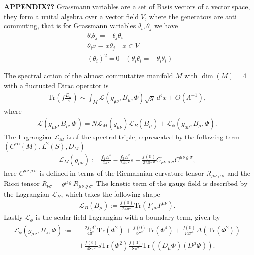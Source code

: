 \textbf{APPENDIX??}
Grassmann variables are a set of Basis vectors of a vector space, they
form a unital algebra over a vector field $V$, where the generators are
anti commuting, that is for Grassmann variables $\theta _i, \theta _j$  we have
\begin{align}
    &\theta _i \theta _j = -\theta _j \theta _i \\
    &\theta _i x = x\theta _j \;\;\;\; x\in V \\
    &(\theta_i)^2 = 0 \;\;\; (\theta _i \theta _i = -\theta _i \theta _i)
\end{align}
\begin{proposition}
    The spectral action of the almost commutative manifold $M$ with $\dim(M)
    =4$ with a fluctuated Dirac operator is
    \begin{align}
        \text{Tr}(f\frac{D_\omega}{\Lambda}) \sim \int_M \mathcal{L}(g_{\mu\nu},
         B_\mu, \Phi) \sqrt{g}\ d^4x + O(\Lambda^{-1}),
    \end{align}
    where
    \begin{align}
        \mathcal{L}(g_{\mu\nu}, B_\mu, \Phi) =
        N\mathcal{L}_M(g_{\mu\nu})
        \mathcal{L}_B(B_\mu)+
        \mathcal{L}_\phi(g_{\mu\nu}, B_\mu, \Phi).
    \end{align}
    The Lagrangian $\mathcal{L}_M$ is of the spectral triple, represented by
    the following term
    $(C^\infty(M) , L^2(S), D_M)$
    \begin{align}\label{lagr}
        \mathcal{L}_M(g_{\mu\nu}) := \frac{f_4 \Lambda ^4}{2\pi^2} -
        \frac{f_2 \Lambda^2}{24\pi ^2}s - \frac{f(0)}{320\pi^2} C_{\mu\nu
        \varrho \sigma}C^{\mu\nu \varrho \sigma},
    \end{align}
    here $C^{\mu\nu \varrho \sigma}$ is defined in terms of the Riemannian
    curvature tensor $R_{\mu\nu \varrho \sigma}$ and the Ricci tensor
    $R_{\nu\sigma} = g^{\mu\varrho} R_{\mu\nu \varrho\sigma}$.
    The kinetic term of the gauge field is described by the Lagrangian
    $\mathcal{L}_B$, which takes the following shape
    \begin{align}
        \mathcal{L}_B(B_\mu) := \frac{f(0)}{24\pi^2}
        \text{Tr}(F_{\mu\nu}F^{\mu\nu}).
    \end{align}
    Lastly $\mathcal{L}_\phi$ is the scalar-field Lagrangian with a boundary
    term, given by
    \begin{align}
        \mathcal{L}_\phi(g_{\mu\nu}, B_\mu, \Phi) :=
        &-\frac{2f_2\Lambda^2}{4\pi^2}\text{Tr}(\Phi^2) + \frac{f(0)}{8\pi^2}
        \text{Tr}(\Phi^4) + \frac{f(0)}{24\pi^2}
        \Delta(\text{Tr}(\Phi^2))\nonumber\\
        &+ \frac{f(0)}{48\pi^2}s\text{Tr}(\Phi^2)
        \frac{f(0)}{8\pi^2}\text{Tr}((D_\mu \Phi)(D^\mu \Phi)).
    \end{align}
\end{proposition}
